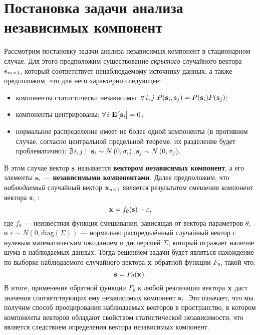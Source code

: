 \section{Постановка задачи анализа независимых компонент}  \label{appendix:ica_description}

Рассмотрим постановку задачи анализа независимых компонент в стационарном случае. Для этого предположим существование \textit{скрытого} случайного вектора $\mathrm{\mathbf{s}}_{m \times 1}$, который соответствует ненаблюдаемому источнику данных, а также предположим, что для него характерно следующее:
\begin{itemize}
    \item компоненты статистически независимы: $\forall\, i,j\ P(\mathrm{\mathbf{s}}_{i}, \mathrm{\mathbf{s}}_{j}) = P(\mathrm{\mathbf{s}}_{i}) P(\mathrm{\mathbf{s}}_{j})$;
    \item компоненты центрированы: $\forall\, i\ \expectation{\vector{s}_{i}} = 0$;
    \item нормальное распределение имеет не более одной компоненты (в противном случае, согласно центральной предельной теореме, их разделение будет проблематично): $\nexists\, i,j:\ \vector{s}_{i} \sim N\left(0, \sigma_{i}\right), \vector{s}_{j} \sim N\left(0, \sigma_{j}\right)$.
\end{itemize}
В этом случае вектор $\mathrm{\mathbf{s}}$ называется \textbf{вектором независимых компонент}, а его элементы $\mathrm{\mathbf{s}}_{i}$ --- \textbf{независимыми компонентами}. Далее предположим, что \textit{наблюдаемый} случайный вектор $\mathrm{\mathbf{x}}_{n \times 1}$ является результатом смешения компонент вектора $\mathrm{\mathbf{s}}$, \ie: $$\mathrm{\mathbf{x}} = f_{\theta}(\mathrm{\mathbf{s}}) + \mathrm{\mathbf{\varepsilon}},$$ где $f_{\theta}$ --- неизвестная функция смешивания, зависящая от вектора параметров $\theta$, и $\varepsilon \sim N\left(0, \text{diag}\left(\Sigma\right)\right)$ --- нормально распределённый случайный вектор с нулевым математическим ожиданием и дисперсией $\Sigma$, который отражает наличие шума в наблюдаемых данных. Тогда решением задачи  будет являться нахождение по выборке наблюдаемого случайного вектора $\mathrm{\mathbf{x}}$ обратной функции $F_{\theta}$, такой что: $$\mathrm{\mathbf{s}} = F_{\theta}(\mathrm{\mathbf{x}}).$$ 
В итоге, применение обратной функции $F_{\theta}$ к любой реализации вектора $\mathrm{\mathbf{x}}$ даст значения соответствующих ему независимых компонент $\mathrm{\mathbf{s}}_{i}$. Это означает, что мы получим способ проецирования наблюдаемых векторов в пространство, в котором компоненты векторов обладают свойством статистической независимости, что является следствием определения вектора независимых компонент.

